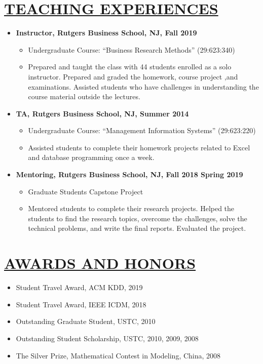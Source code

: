 \documentclass[11pt,letterpage]{res}
\begin{document}
\begin{resume}
\section{\underline{TEACHING EXPERIENCES}}
\begin{itemize}
	\item
{\bf Instructor, Rutgers Business School, NJ, Fall 2019}
 \begin{itemize}
	\item Undergraduate Course: “Business Research Methods” (29:623:340)
 	\item Prepared and taught the class with 44 students enrolled as a solo instructor. Prepared and graded the homework, course project ,and examinations. Assisted students who have challenges in understanding the course material outside the lectures.
 \end{itemize}
    \item
{\bf TA, Rutgers Business School, NJ, Summer 2014}
\begin{itemize}
	\item Undergraduate Course: “Management Information Systems” (29:623:220)
 	\item Assisted students to complete their homework projects related to Excel and database programming once a week.
\end{itemize}
	\item
{\bf Mentoring, Rutgers Business School, NJ, Fall 2018 Spring 2019}
\begin{itemize}
	\item Graduate Students Capstone Project
 	\item Mentored students to complete their research projects. Helped the students to find the research topics, overcome the challenges, solve the technical problems, and write the final reports. Evaluated the project. 
\end{itemize}
\end{itemize}


\section{\underline{AWARDS AND HONORS}}
\begin{itemize} \itemsep -3pt
\item Student Travel Award, ACM KDD, 2019
\item Student Travel Award, IEEE ICDM, 2018
\item Outstanding Graduate Student, USTC, 2010
\item Outstanding Student Scholarship, USTC, 2010, 2009, 2008
\item The Silver Prize, Mathematical Contest in Modeling, China, 2008
\end{itemize}


\end{resume}
\end{document}
